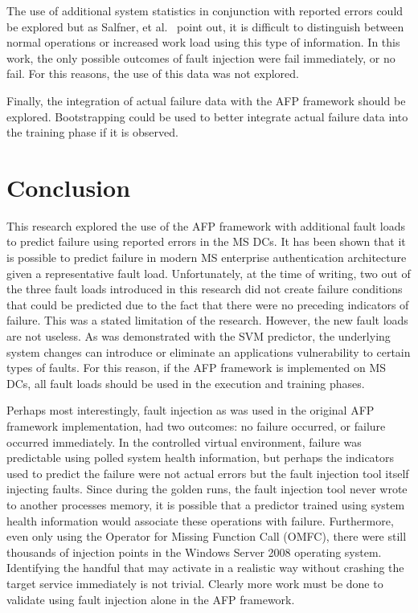 The use of additional system statistics in conjunction with reported errors
could be explored but as Salfner, et al.~\cite{salfnerSurvey} point out, it is
difficult to distinguish between normal operations or increased work load using
this type of information.  In this work, the only possible outcomes of fault
injection were fail immediately, or no fail.  For this reasons, the use of this
data was not explored.

Finally, the integration of actual failure data with the \ac{AFP} framework
should be explored.  Bootstrapping could be used to better integrate actual
failure data into the training phase if it is observed. 

\section{Conclusion}
This research explored the use of the \ac{AFP} framework with additional fault
loads to predict failure using reported errors in the \ac{MS} \ac{DC}s.  It has
been shown that it is possible to predict failure in modern \ac{MS} enterprise
authentication architecture given a representative fault load.  Unfortunately,
at the time of writing, two out of the three fault loads introduced in this
research did not create failure conditions that could be predicted due to the
fact that there were no preceding indicators of failure.  This was a stated
limitation of the research.  However, the new fault loads are not useless.  As
was demonstrated with the \ac{SVM} predictor, the underlying system changes can
introduce or eliminate an applications vulnerability to certain types of
faults.  For this reason, if the \ac{AFP} framework is implemented on \ac{MS}
\ac{DC}s, all fault loads should be used in the execution and training phases.

Perhaps most interestingly, fault injection as was used in the original
\ac{AFP} framework implementation, had two outcomes: no failure occurred, or
failure occurred immediately.  In the controlled virtual environment, failure
was predictable using polled system health information, but perhaps the
indicators used to predict the failure were not actual errors but the fault
injection tool itself injecting faults.  Since during the golden runs, the
fault injection tool never wrote to another processes memory, it is possible
that a predictor trained using system health information would associate these
operations with failure.  Furthermore, even only using the Operator for Missing
Function Call (OMFC), there were still thousands of injection points in the
Windows Server 2008 operating system.  Identifying the handful that may
activate in a realistic way without crashing the target service immediately is
not trivial.  Clearly more work must be done to validate using fault injection
alone in the \ac{AFP} framework.

